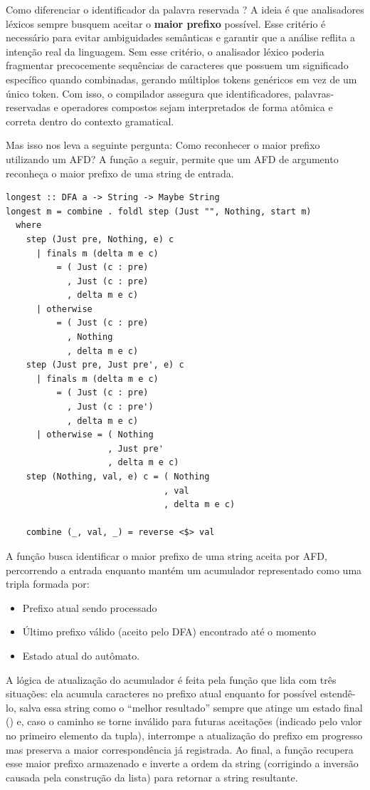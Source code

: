 Como diferenciar o identificador  da
palavra reservada ? A ideia é que
analisadores léxicos sempre busquem aceitar o \textbf{maior prefixo}
possível. Esse critério é necessário para evitar ambiguidades
semânticas e garantir que a análise reflita a intenção real da
linguagem. Sem esse critério, o analisador léxico poderia fragmentar
precocemente sequências de caracteres que possuem um significado
específico quando combinadas, gerando múltiplos tokens genéricos em
vez de um único token. Com isso, o compilador assegura que
identificadores, palavras-reservadas e operadores compostos sejam
interpretados de forma atômica e correta dentro do contexto gramatical.

Mas isso nos leva a seguinte pergunta: Como reconhecer o maior
prefixo utilizando um AFD? A função a seguir, permite que um AFD de
argumento reconheça o maior prefixo de uma string de entrada.

\begin{verbatim}
longest :: DFA a -> String -> Maybe String
longest m = combine . foldl step (Just "", Nothing, start m)
  where
    step (Just pre, Nothing, e) c
      | finals m (delta m e c)
          = ( Just (c : pre)
            , Just (c : pre)
            , delta m e c)
      | otherwise
          = ( Just (c : pre)
            , Nothing
            , delta m e c)
    step (Just pre, Just pre', e) c
      | finals m (delta m e c)
          = ( Just (c : pre)
            , Just (c : pre')
            , delta m e c)
      | otherwise = ( Nothing
                    , Just pre'
                    , delta m e c)
    step (Nothing, val, e) c = ( Nothing
                               , val
                               , delta m e c)

    combine (_, val, _) = reverse <$> val
\end{verbatim}

A função  busca identificar o maior
prefixo de uma string aceita por AFD, percorrendo a entrada enquanto
mantém um acumulador representado como uma tripla formada por:

\begin{itemize}
  \item
    Prefixo atual sendo processado
  \item
    Último prefixo válido (aceito pelo DFA) encontrado até o momento
  \item
    Estado atual do autômato.
\end{itemize}

A lógica de atualização do acumulador é feita pela função
 que lida com três situações: ela
acumula caracteres no prefixo atual enquanto for possível estendê-lo,
salva essa string como o ``melhor resultado'' sempre que atinge um
estado final () e, caso o caminho se
torne inválido para futuras aceitações (indicado pelo valor
 no primeiro elemento da tupla),
interrompe a atualização do prefixo em progresso mas preserva a maior
correspondência já registrada. Ao final, a função
 recupera esse maior prefixo
armazenado e inverte a ordem da string (corrigindo a inversão causada
pela construção da lista) para retornar a string resultante.

